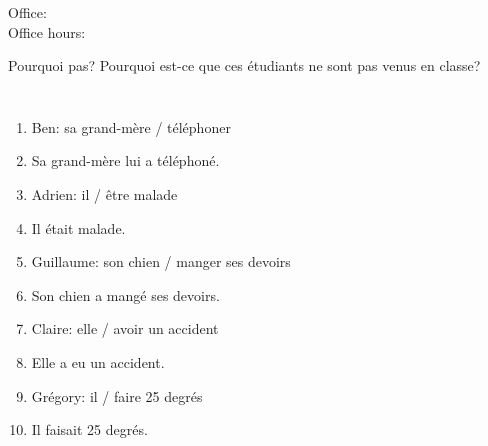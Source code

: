 \documentclass{beamer}
\subtitle[Température et narration]{La température et la narration}
\begin{document}
  \begin{frame}
    \titlepage
    \tiny{Office: \\
          Office hours: }
  \end{frame}

  \begin{frame}{Pourquoi pas?}
    Pourquoi est-ce que ces étudiants ne sont pas venus en classe?
    \begin{columns}
        \small
        \begin{enumerate}
          \item Ben: sa grand-mère / téléphoner
          \item<2->[$\to$] Sa grand-mère lui a téléphoné.
          \item<3-> Adrien: il / être malade
          \item<4->[$\to$] Il était malade.
          \item<5-> Guillaume: son chien / manger ses devoirs
          \item<6->[$\to$] Son chien a mangé ses devoirs.
          \item<7-> Claire: elle / avoir un accident
          \item<8->[$\to$] Elle a eu un accident.
          \item<9-> Grégory: il / faire 25 degrés
          \item<10->[$\to$] Il faisait 25 degrés.
        \end{enumerate}
        \begin{minipage}[0.6\textheight]{\linewidth}
          \begin{center}
          \end{center}
        \end{minipage}
    \end{columns}
  \end{frame}
\end{document}
